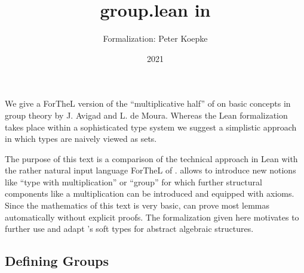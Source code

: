 \documentclass{article}
\title{group.lean in \Naproche}
\author{\Naproche Formalization: Peter Koepke}
\date{2021}
\begin{document}

  \maketitle
\noindent We give a ForTheL version of the ``multiplicative half'' of
 on basic concepts in group theory 
by J. Avigad and L. de Moura.
Whereas the Lean formalization takes place within a sophisticated type system
we suggest a simplistic approach in which types are naively viewed as sets.

The purpose of this text is a comparison of the technical approach in Lean
with the rather natural input language ForTheL of \Naproche{}.
\Naproche{} allows to introduce new notions like ``type with multiplication''
or ``group'' for which further structural components like a multiplication can
be introduced and equipped with axioms. Since the mathematics of this
text is very basic, \Naproche{} can prove most lemmas automatically without
explicit proofs. The formalization given here motivates to further
use and adapt \Naproche{}'s soft types for abstract algebraic structures. 

\subsection{Defining Groups}
\end{document}
